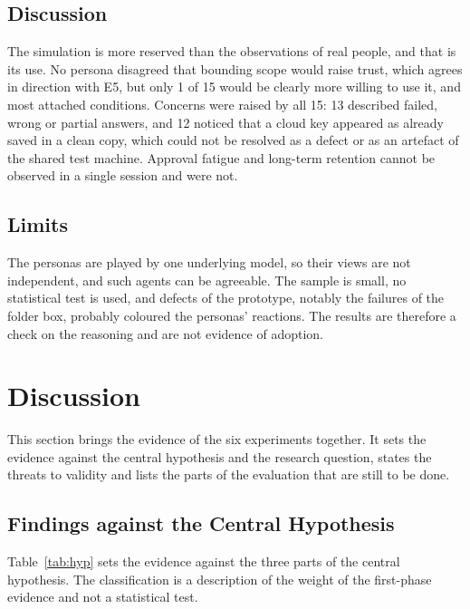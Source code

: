 \documentclass{FastFyp}
\begin{document}
\subsection{Discussion}
The simulation is more reserved than the observations of real people, and that is its use. No persona disagreed that bounding scope would raise trust, which agrees in direction with E5, but only 1 of 15 would be clearly more willing to use it, and most attached conditions. Concerns were raised by all 15: 13 described failed, wrong or partial answers, and 12 noticed that a cloud key appeared as already saved in a clean copy, which could not be resolved as a defect or as an artefact of the shared test machine. Approval fatigue and long-term retention cannot be observed in a single session and were not.

\subsection{Limits}
The personas are played by one underlying model, so their views are not independent, and such agents can be agreeable. The sample is small, no statistical test is used, and defects of the prototype, notably the failures of the folder box, probably coloured the personas' reactions. The results are therefore a check on the reasoning and are not evidence of adoption.


\section{Discussion}
This section brings the evidence of the six experiments together. It sets the evidence against the central hypothesis and the research question, states the threats to validity and lists the parts of the evaluation that are still to be done.

\subsection{Findings against the Central Hypothesis}
Table~\ref{tab:hyp} sets the evidence against the three parts of the central hypothesis. The classification is a description of the weight of the first-phase evidence and not a statistical test.
\end{document}
